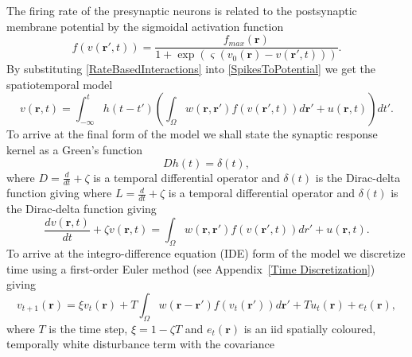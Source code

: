 \documentclass[12pt]{iopart}		%
\begin{document}
The firing rate of the presynaptic neurons is related to the postsynaptic membrane potential by the sigmoidal activation function
\begin{equation}\label{ActivationFunction}
	f\left( v\left( \mathbf{r}', t \right) \right) = \frac{f_{max}\left(\mathbf{r}\right)}{1 + \exp \left( \varsigma \left( v_0\left( \mathbf{r} \right) - v\left(\mathbf{r}',t\right) \right) \right)}.
\end{equation}
By substituting \ref{RateBasedInteractions} into \ref{SpikesToPotential}  we get the spatiotemporal model
\begin{equation}\label{FullDoubleIntModel}
	v\left(\mathbf{r},t\right) = \int_{-\infty}^t h\left(t - t'\right) \left(\int_\Omega   w\left(\mathbf{r},\mathbf{r}'\right) f\left( v\left( \mathbf{r}',t \right)\right)d\mathbf{r}' + u(\mathbf{r},t) \right)dt'.
\end{equation}
To arrive at the final form of the model we shall state the synaptic response kernel as a Green's function
\begin{equation}\label{GreensFuncDef}
	Dh\left( t \right) = \delta \left( t \right),
\end{equation}
where $D=\frac{d}{dt} + \zeta$ is a temporal differential operator and $\delta(t)$ is the Dirac-delta function giving 
where $L=\frac{d}{dt} + \zeta$ is a temporal differential operator and $\delta(t)$ is the Dirac-delta function giving 
\begin{equation}\label{FinalFormContinuous}
	\frac{dv\left( \mathbf{r},t \right)}{dt} + \zeta v\left( \mathbf{r},t \right) = \int_\Omega  {w\left( \mathbf{r},\mathbf{r}' \right)f\left( {v\left( \mathbf{r}',t \right)} \right)dr'} + u\left(\mathbf{r},t\right).
\end{equation}
To arrive at the integro-difference equation (IDE) form of the model we discretize time using a first-order Euler method (see Appendix~\ref{Time Discretization}) giving
\begin{equation}\label{DiscreteTimeModel}
	v_{t+1}\left(\mathbf{r}\right) = \xi v_t\left(\mathbf{r}\right) + T \int_\Omega { w\left(\mathbf{r}-\mathbf{r}'\right) f\left(v_t\left(\mathbf{r}'\right)\right) d\mathbf{r}'} + T u_t\left(\mathbf{r}\right) + e_t\left(\mathbf{r}\right),
\end{equation} 
where $T$ is the time step, $\xi = 1-\zeta T$ and $e_t\left(\mathbf{r}\right)$ is an iid spatially coloured, temporally white disturbance term with the covariance 
\end{document}
